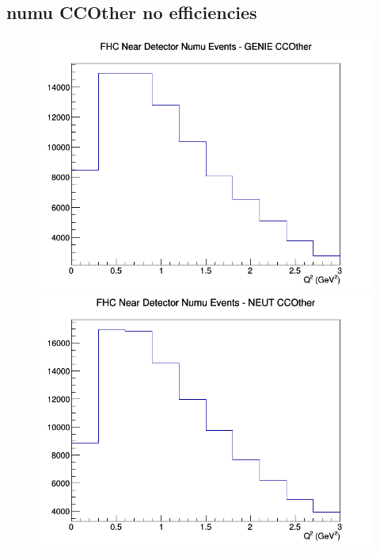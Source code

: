 \documentclass[12pt]{article}
\begin{document}
\subsection{numu CCOther no efficiencies}
\begin{figure}[h]
\includegraphics[width=\linewidth]{Q2/nominal/CCOther_FHC_ND_numu_Q2_GENIE.png}
\endminipage
{}
\includegraphics[width=\linewidth]{Q2/nominal/CCOther_FHC_ND_numu_Q2_NEUT.png}
\endminipage
{}

\end{figure}
\end{document}
